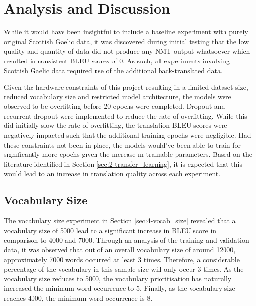 
\chapter{Analysis and Discussion}

While it would have been insightful to include a baseline experiment with purely original Scottish Gaelic data, it was discovered during initial testing that the low quality and quantity of data did not produce any \acrshort{NMT} output whatsoever which resulted in consistent \acrshort{BLEU} scores of 0. As such, all experiments involving Scottish Gaelic data required use of the additional back-translated data.

Given the hardware constraints of this project resulting in a limited dataset size, reduced vocabulary size and restricted model architecture, the models were observed to be overfitting before 20 epochs were completed. Dropout and recurrent dropout were implemented to reduce the rate of overfitting. While this did initially slow the rate of overfitting, the translation \acrshort{BLEU} scores were negatively impacted such that the additional training epochs were negligible. Had these constraints not been in place, the models would've been able to train for significantly more epochs given the increase in trainable parameters. Based on the literature identified in Section \ref{sec:2-transfer_learning}, it is expected that this would lead to an increase in translation quality across each experiment.

\section{Vocabulary Size}
The vocabulary size experiment in Section \ref{sec:4-vocab_size} revealed that a vocabulary size of 5000 lead to a significant increase in \acrshort{BLEU} score in comparison to 4000 and 7000. Through an analysis of the training and validation data, it was observed that out of an overall vocabulary size of around 12000, approximately 7000 words occurred at least 3 times. Therefore, a considerable percentage of the vocabulary in this sample size will only occur 3 times. As the vocabulary size reduces to 5000, the vocabulary prioritisation has naturally increased the minimum word occurrence to 5. Finally, as the vocabulary size reaches 4000, the minimum word occurrence is 8.

